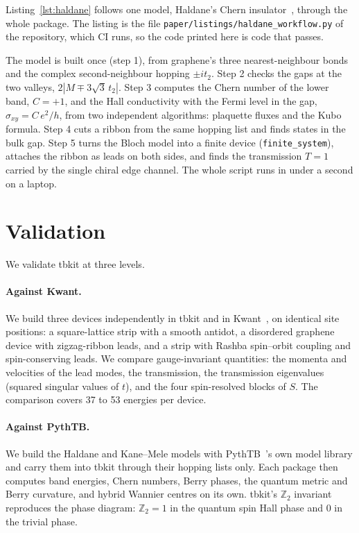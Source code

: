 \documentclass[submission, Phys]{SciPost}
\newcommand{\code}[1]{\texttt{#1}}
\begin{document}
Listing~\ref{lst:haldane} follows one model, Haldane's Chern
insulator~\cite{haldane1988}, through the whole package. The listing is
the file \code{paper/listings/haldane\_workflow.py} of the repository, which
CI runs, so the code printed here is code that passes.



The model is built once (step 1), from graphene's three nearest-neighbour
bonds and the complex second-neighbour hopping $\pm i t_2$. Step 2 checks
the gaps at the two valleys, $2|M \mp 3\sqrt3\,t_2|$. Step 3 computes the
Chern number of the lower band, $C = +1$, and the Hall conductivity with
the Fermi level in the gap, $\sigma_{xy} = C\,e^2/h$, from two independent
algorithms: plaquette fluxes and the Kubo formula. Step 4 cuts a ribbon
from the same hopping list and finds states in the bulk gap. Step 5 turns
the Bloch model into a finite device (\code{finite\_system}), attaches the
ribbon as leads on both sides, and finds the transmission $T = 1$ carried by
the single chiral edge channel. The whole script runs in under a second on
a laptop.

\section{Validation}
\label{sec:validation}

We validate tbkit at three levels.

\paragraph{Against Kwant.} We build three devices independently in tbkit and in
Kwant~\kwantversion, on identical site positions:
a square-lattice strip with a smooth antidot, a disordered graphene device
with zigzag-ribbon leads, and a strip with Rashba spin--orbit coupling and
spin-conserving leads. We compare gauge-invariant quantities: the momenta
and velocities of the lead modes, the transmission, the transmission
eigenvalues (squared singular values of $t$), and the four spin-resolved
blocks of $S$. The comparison covers 37 to 53 energies per device.

\paragraph{Against PythTB.} We build the Haldane and Kane--Mele models with
PythTB~\pythtbversion's own model library and carry them into tbkit
through their hopping lists only. Each package then computes band energies,
Chern numbers, Berry phases, the quantum metric and Berry curvature, and
hybrid Wannier centres on its own. tbkit's $\mathbb{Z}_2$ invariant
reproduces the phase diagram: $\mathbb{Z}_2 = 1$ in the quantum spin Hall
phase and 0 in the trivial phase.
\end{document}
